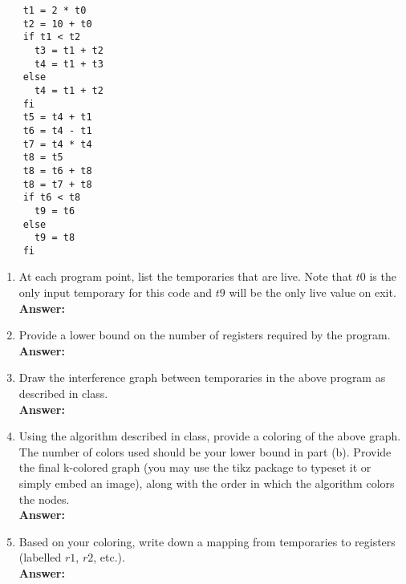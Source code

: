 \documentclass[11pt]{article}
\begin{document}
\begin{enumerate}
  \begin{lstlisting}
    t1 = 2 * t0
    t2 = 10 + t0
    if t1 < t2
      t3 = t1 + t2
      t4 = t1 + t3
    else
      t4 = t1 + t2
    fi
    t5 = t4 + t1
    t6 = t4 - t1
    t7 = t4 * t4
    t8 = t5
    t8 = t6 + t8
    t8 = t7 + t8
    if t6 < t8
      t9 = t6
    else
      t9 = t8
    fi
  \end{lstlisting}
  \begin{enumerate}
    \item At each program point, list the temporaries that are live. Note that $t0$ is the only input temporary for this code and $t9$ will be the only live value on exit.\\
    \textbf{Answer:} 
    
   \newpage
    \item Provide a lower bound on the number of registers required by the program.\\
    \textbf{Answer:} 
    
   \newpage
    \item Draw the interference graph between temporaries in the above program as described in class.\\
    \textbf{Answer:} 
    
   \newpage
    \item Using the algorithm described in class, provide a coloring of the above graph. The number of colors used should be your lower bound in part (b). Provide the final k-colored graph (you may use the tikz package to typeset it or simply embed an image), along with the order in which the algorithm colors the nodes.\\
    \textbf{Answer:} 
    
   \newpage
    \item Based on your coloring, write down a mapping from temporaries to registers (labelled $r1$, $r2$, etc.).\\
    \textbf{Answer:} 
    
   \newpage
  \end{enumerate}
  
\end{enumerate}
\end{document}

